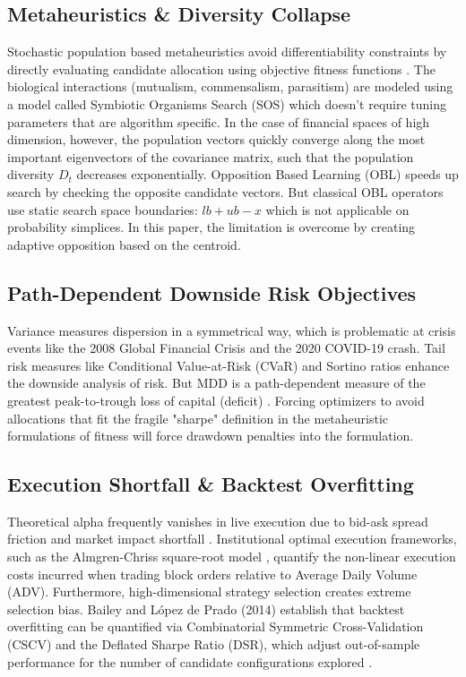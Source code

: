 \documentclass[11pt,a4paper]{article}
\begin{document}
\subsection{Metaheuristics \& Diversity Collapse}
Stochastic population based metaheuristics avoid differentiability constraints by directly evaluating candidate allocation using objective fitness functions \citep{maringer2005, corne2012}. The biological interactions (mutualism, commensalism, parasitism) are modeled using a model called Symbiotic Organisms Search (SOS) \cite{cheng2014} which doesn't require tuning parameters that are algorithm specific. In the case of financial spaces of high dimension, however, the population vectors quickly converge along the most important eigenvectors of the covariance matrix, such that the population diversity $D_t$ decreases exponentially. Opposition Based Learning (OBL) \cite{gopi2024} speeds up search by checking the opposite candidate vectors. But classical OBL operators use static search space boundaries: $lb + ub - x$ which is not applicable on probability simplices. In this paper, the limitation is overcome by creating adaptive opposition based on the centroid.

\subsection{Path-Dependent Downside Risk Objectives}
Variance measures dispersion in a symmetrical way, which is problematic at crisis events like the 2008 Global Financial Crisis and the 2020 COVID-19 crash. Tail risk measures like Conditional Value-at-Risk (CVaR) \cite{rockafellar2000} and Sortino ratios \cite{sortino1994} enhance the downside analysis of risk. But MDD is a path-dependent measure of the greatest peak-to-trough loss of capital (deficit) \cite{magdon2004, chekhlov2005}. Forcing optimizers to avoid allocations that fit the fragile "sharpe" definition in the metaheuristic formulations of fitness will force drawdown penalties into the formulation.

\subsection{Execution Shortfall \& Backtest Overfitting}
Theoretical alpha frequently vanishes in live execution due to bid-ask spread friction and market impact shortfall \cite{horst2024}. Institutional optimal execution frameworks, such as the Almgren-Chriss square-root model \cite{horst2024}, quantify the non-linear execution costs incurred when trading block orders relative to Average Daily Volume (ADV). Furthermore, high-dimensional strategy selection creates extreme selection bias. Bailey and López de Prado (2014) \cite{bailey2024} establish that backtest overfitting can be quantified via Combinatorial Symmetric Cross-Validation (CSCV) and the Deflated Sharpe Ratio (DSR), which adjust out-of-sample performance for the number of candidate configurations explored \cite{olmo2023, prado2018}.
\end{document}
